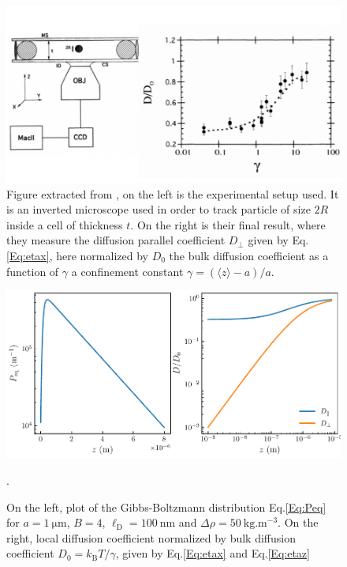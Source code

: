 \begin{figure}
	\centering
	\includegraphics{02_body/chapter1/image/libchaber.pdf}
	\caption{Figure extracted from \cite{faucheux_confined_1994}, on the left is the experimental setup used. It is an inverted microscope used in order to track particle of size $2R$ inside a cell of thickness $t$. On the right is their final result, where they measure the diffusion parallel coefficient $D_\bot$ given by Eq.\ref{Eq:etax}, here normalized by $D_0$ the bulk diffusion coefficient as a function of  $\gamma$ a confinement constant $\gamma = (\langle z \rangle -a)/a$. }
	\label{fig:libchaber}
\end{figure}



\begin{figure}[ht]
	\centering
	\includegraphics{02_body/chapter1/image/theorie_chap1.pdf}
	\caption{On the left, plot of the Gibbs-Boltzmann distribution Eq.\ref{Eq:Peq} for $a = 1 ~ \mathrm{\mu m}$, $ B = 4 $, $\ell _\mathrm{D} = 100 ~ \mathrm{nm}$ and $\Delta \rho = 50 ~ \mathrm{kg.m^{-3}}$. On the right, local diffusion coefficient normalized by bulk diffusion coefficient $D_0 = k_\mathrm{B}T/\gamma$, given by Eq.\ref{Eq:etax} and Eq.\ref{Eq:etaz}}.
\end{figure}








